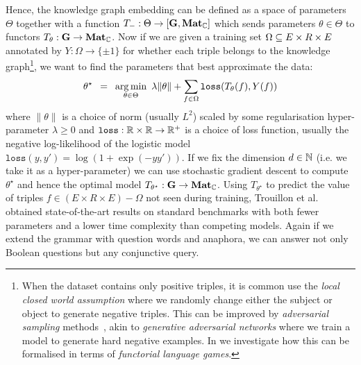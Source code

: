 Hence, the knowledge graph embedding can be defined as a space of parameters $\Theta$ together with a function $T_- : \Theta \to [\mathbf{G}, \mathbf{Mat}_{\mathbb{C}}]$ which sends parameters $\theta \in \Theta$ to functors $T_\theta : \mathbf{G} \to \mathbf{Mat}_{\mathbb{C}}$.
Now if we are given a training set $\Omega \subseteq E \times R \times E$ annotated by $Y : \Omega \to \{ \pm 1 \}$ for whether each triple belongs to the knowledge graph\footnote
{When the dataset contains only positive triples, it is common use the \emph{local closed world assumption} where we randomly change either the subject or object to generate negative triples.
This can be improved by \emph{adversarial sampling} methods~\cite{CaiWang18}, akin to \emph{generative adversarial networks} where we train a model to generate hard negative examples.
In \cite{FeliceEtAl20} we investigate how this can be formalised in terms of \emph{functorial language games}.},
we want to find the parameters that best approximate the data:
$$
\theta^\star \enspace = \enspace \operatorname*{arg\,min}_{\theta \in \Theta} \
\lambda \lVert \theta \rVert + \sum_{f \in \Omega} \mathtt{loss}(T_\theta(f), Y(f))
$$
where $\lVert \theta \rVert$ is a choice of norm (usually $L^2$) scaled by some regularisation hyper-parameter $\lambda \geq 0$ and $\mathtt{loss} : \mathbb{R} \times \mathbb{R} \to \mathbb{R}^+$ is a choice of loss function, usually the negative log-likelihood of the logistic model $\mathtt{loss}(y, y') = \log (1 + \exp(-yy'))$.
If we fix the dimension $d \in \mathbb{N}$ (i.e. we take it as a hyper-parameter) we can use stochastic gradient descent to compute $\theta^\star$ and hence the optimal model $T_{\theta^\star} : \mathbf{G} \to \mathbf{Mat}_{\mathbb{C}}$.
Using $T_{\theta^\star}$ to predict the value of triples $f \in (E \times R \times E) - \Omega$ not seen during training, Trouillon et al. obtained state-of-the-art results on standard benchmarks with both fewer parameters and a lower time complexity than competing models.
Again if we extend the grammar with question words and anaphora, we can answer not only Boolean questions but any conjunctive query.

